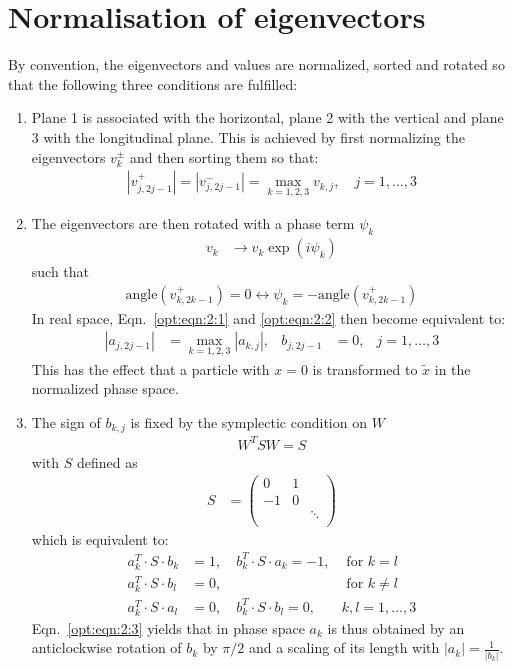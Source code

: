 \section{Normalisation of eigenvectors}
\label{opt:sec:2}
By convention, the eigenvectors and values are normalized, sorted and rotated so that the following three conditions are fulfilled:
\begin{enumerate}
\item Plane 1 is associated with the horizontal, plane 2 with the vertical and plane 3 with the longitudinal plane. This is achieved by first normalizing the eigenvectors $v_k^{\pm}$ and then sorting them so that:
\begin{align}\label{opt:eqn:2:1}
|v_{j,2j-1}^{+}| =|v_{j,2j-1}^{-}| = \max_{k=1,2,3} v_{k,j}, \quad j=1,\ldots, 3
\end{align}
\item The eigenvectors are then rotated with a phase term $\psi_k$
\begin{align}
v_k& \to v_k \exp(i \psi_k) 
\end{align}
such that
\begin{align}\label{opt:eqn:2:2}
\mathrm{angle}(v_{k,2k-1}^{+})=0 \leftrightarrow \psi_k=-\mathrm{angle}(v_{k,2k-1}^{+})
\end{align}
In real space, Eqn.~\ref{opt:eqn:2:1} and \ref{opt:eqn:2:2} then become equivalent to:
\begin{align}
|a_{j,2j-1}| &=\max_{k=1,2,3} |a_{k,j}|,& b_{j,2 j-1}&=0, & j=1,\ldots, 3
\end{align}
This has the effect that a particle with $x=0$ is transformed to $\tilde x$ in the normalized phase space.
\item The sign of $b_{k,j}$ is fixed by the symplectic condition on $W$
\begin{align}
W^T S W = S
\end{align}
with $S$ defined as
\begin{align}
S&=\left(
\begin{array}{ccc}
0 & 1  &  \\
-1 & 0  &  \\
&    & \ddots \\
\end{array} 
\right)
\end{align}
which is equivalent to:
\begin{align}\label{opt:eqn:2:3}
a_k^T \cdot S \cdot b_k &=1, \quad b_k^T \cdot S \cdot a_k =-1, & \text{ for } k=l\nonumber\\
a_k^T \cdot S \cdot b_l &=0, & \text{ for }  k\not=l\\
a_k^T \cdot S \cdot a_l &=0, \quad b_k^T \cdot S \cdot b_l =0,  & k,l=1,\ldots,3 \nonumber
\end{align}
Eqn.~\ref{opt:eqn:2:3} yields that in phase space $a_k$ is thus obtained by an anticlockwise rotation of $b_k$ by $\pi/2$ and a scaling of its length with $|a_k|=\frac{1}{|b_k|}$.
\end{enumerate}
